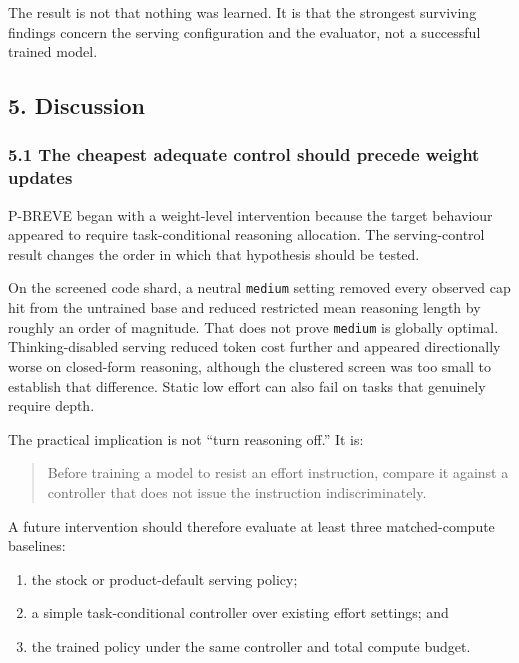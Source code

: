 \documentclass[
]{article}
\providecommand{\tightlist}{%
  \setlength{\itemsep}{0pt}\setlength{\parskip}{0pt}}
\begin{document}
The result is not that nothing was learned. It is that the strongest
surviving findings concern the serving configuration and the evaluator,
not a successful trained model.

\subsection{5. Discussion}\label{5-discussion}

\subsubsection{5.1 The cheapest adequate control should precede weight
updates}\label{51-the-cheapest-adequate-control-should-precede-weight-updates}

P-BREVE began with a weight-level intervention because the target
behaviour appeared to require task-conditional reasoning allocation. The
serving-control result changes the order in which that hypothesis should
be tested.

On the screened code shard, a neutral \texttt{medium} setting removed
every observed cap hit from the untrained base and reduced restricted
mean reasoning length by roughly an order of magnitude. That does not
prove \texttt{medium} is globally optimal. Thinking-disabled serving
reduced token cost further and appeared directionally worse on
closed-form reasoning, although the clustered screen was too small to
establish that difference. Static low effort can also fail on tasks that
genuinely require depth.

The practical implication is not ``turn reasoning off.'' It is:

\begin{quote}
Before training a model to resist an effort instruction, compare it
against a controller that does not issue the instruction
indiscriminately.
\end{quote}

A future intervention should therefore evaluate at least three
matched-compute baselines:

\begin{enumerate}
\def\labelenumi{\arabic{enumi}.}
\tightlist
\item
  the stock or product-default serving policy;
\item
  a simple task-conditional controller over existing effort settings;
  and
\item
  the trained policy under the same controller and total compute budget.
\end{enumerate}
\end{document}
